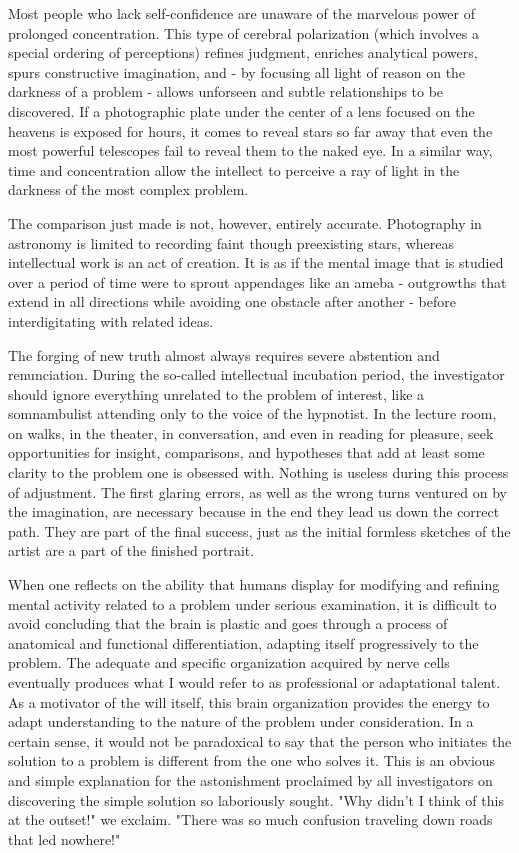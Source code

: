 \documentclass{article}
\begin{document}
Most people who lack self-confidence are unaware of the marvelous power of prolonged concentration. This type of cerebral polarization (which involves a special ordering of perceptions) refines judgment, enriches analytical powers, spurs constructive imagination, and - by focusing all light of reason on the darkness of a problem - allows unforseen and subtle relationships to be discovered. If a photographic plate under the center of a lens focused on the heavens is exposed for hours, it comes to reveal stars so far away that even the most powerful telescopes fail to reveal them to the naked eye. In a similar way, time and concentration allow the intellect to perceive a ray of light in the darkness of the most complex problem.

The comparison just made is not, however, entirely accurate. Photography in astronomy is limited to recording faint though preexisting stars, whereas intellectual work is an act of creation. It is as if the mental image that is studied over a period of time were to sprout appendages like an ameba - outgrowths that extend in all directions while avoiding one obstacle after another - before interdigitating with related ideas.

The forging of new truth almost always requires severe abstention and renunciation. During the so-called intellectual incubation period, the investigator should ignore everything unrelated to the problem of interest, like a somnambulist attending only to the voice of the hypnotist. In the lecture room, on walks, in the theater, in conversation, and even in reading for pleasure, seek opportunities for insight, comparisons, and hypotheses that add at least some clarity to the problem one is obsessed with. Nothing is useless during this process of adjustment. The first glaring errors, as well as the wrong turns ventured on by the imagination, are necessary because in the end they lead us down the correct path. They are part of the final success, just as the initial formless sketches of the artist are a part of the finished portrait.

When one reflects on the ability that humans display for modifying and refining mental activity related to a problem under serious examination, it is difficult to avoid concluding that the brain is plastic and goes through a process of anatomical and functional differentiation, adapting itself progressively to the problem. The adequate and specific organization acquired by nerve cells eventually produces what I would refer to as professional or adaptational talent. As a motivator of the will itself, this brain organization provides the energy to adapt understanding to the nature of the problem under consideration. In a certain sense, it would not be paradoxical to say that the person who initiates the solution to a problem is different from the one who solves it. This is an obvious and simple explanation for the astonishment proclaimed by all investigators on discovering the simple solution so laboriously sought. "Why didn’t I think of this at the outset!" we exclaim. "There was so much confusion traveling down roads that led nowhere!"
\end{document}
